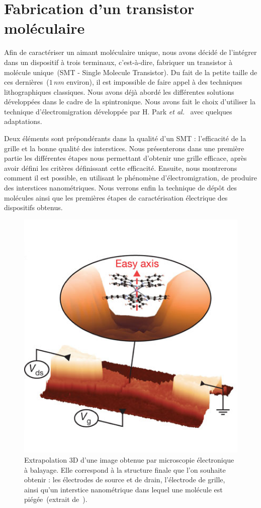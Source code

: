 \chapter{Fabrication d'un transistor moléculaire}
Afin de caractériser un aimant moléculaire unique, nous avons décidé de l'intégrer dans un dispositif à trois terminaux, c'est-à-dire, fabriquer un transistor à molécule unique~(SMT - Single Molecule Transistor). Du fait de la petite taille de ces dernières~($1\,nm$ environ), il est impossible de faire appel à des techniques lithographiques classiques. Nous avons déjà abordé les différentes solutions développées dans le cadre de la spintronique. Nous avons fait le choix d'utiliser la technique d'électromigration développée par H. Park \textit{et al.}~\cite{Park1999} avec quelques adaptations.

Deux éléments sont prépondérants dans la qualité d'un SMT : l’efficacité de la grille et la bonne qualité des interstices. Nous présenterons dans une première partie les différentes étapes nous permettant d'obtenir une grille efficace, après avoir défini les critères définissant cette efficacité. Ensuite, nous montrerons comment il est possible, en utilisant le phénomène d'électromigration, de produire des interstices nanométriques. Nous verrons enfin la technique de dépôt des molécules ainsi que les premières étapes de caractérisation électrique des dispositifs obtenus.


\begin{figure}
\parbox{6.5cm}{
\includegraphics[scale=0.45]{Fabrication/ImageTrans/ImageTrans.pdf} 
}
\parbox{7cm}{\caption{Extrapolation 3D d'une image obtenue par microscopie électronique à balayage. Elle correspond à la structure finale que l'on souhaite obtenir : les électrodes de source et de drain, l'électrode de grille, ainsi qu'un interstice nanométrique dans lequel une molécule est piégée~(extrait de~\cite{Vincent2012}).}
\label{ImageTrans}
}
\end{figure}

